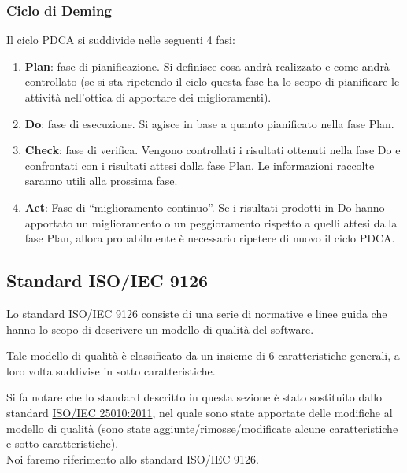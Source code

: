 		\subsubsection{Ciclo di Deming} \label{AppPDCA}
		
			Il ciclo PDCA si suddivide nelle seguenti 4 fasi:
			
			\begin{enumerate}
			
				\item \textbf{Plan}: fase di pianificazione. Si definisce cosa andrà realizzato e come andrà controllato (se si sta ripetendo il ciclo questa fase ha lo scopo di pianificare le attività nell'ottica di apportare dei miglioramenti).
				\item \textbf{Do}: fase di esecuzione. Si agisce in base a quanto pianificato nella fase Plan.
				\item \textbf{Check}: fase di verifica. Vengono controllati i risultati ottenuti nella fase Do e confrontati con i risultati attesi dalla fase Plan. Le informazioni raccolte saranno utili alla prossima fase.
				\item \textbf{Act}: Fase di “miglioramento continuo”. Se i risultati prodotti in Do hanno apportato un miglioramento o un peggioramento rispetto a quelli attesi dalla fase Plan, allora probabilmente è necessario ripetere di nuovo il ciclo PDCA.
				
			\end{enumerate}

	\subsection{Standard ISO/IEC 9126}\label{AppQualitaProdotto}
	
		Lo standard ISO/IEC 9126 consiste di una serie di normative e linee guida che hanno lo scopo di descrivere un modello di qualità del software. 
		
		Tale modello di qualità è classificato da un insieme di 6 caratteristiche generali, a loro volta suddivise in sotto caratteristiche.
		
		Si fa notare che lo standard descritto in questa sezione è stato sostituito dallo standard \href{http://www.iso.org/iso/iso_catalogue/catalogue_tc/catalogue_detail.htm?csnumber=35733}{ISO/IEC 25010:2011}, nel quale sono state apportate delle modifiche al modello di qualità (sono state aggiunte/rimosse/modificate alcune caratteristiche e sotto caratteristiche).\\
		Noi faremo riferimento allo standard ISO/IEC 9126.
		
